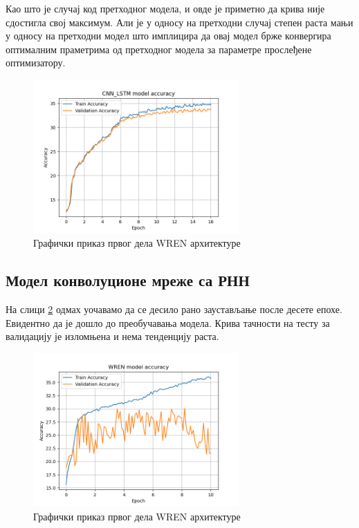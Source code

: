 \documentclass[a4paper, 12pt, master, utf8]{etf}
\begin{document}
Као што је случај код претходног модела, и овде је приметно да крива није сдостигла свој максимум. Али је у односу на претходни случај степен раста мањи у односу на претходни модел што 
имплицира да овај модел брже конвергира оптималним праметрима од претходног модела за параметре прослеђене оптимизатору.
\newline

\begin{figure}[H]
    \centering
    \includegraphics[width=0.7\textwidth]{../Results/CNN_LSTM_21_11_09/accuracy.png}
    \caption{Графички приказ првог дела WREN архитектуре}
    \label{fig:lstmacc}
\end{figure}

\subsection{Модел конволуционе мреже са РНН}

На слици \ref{fig:wrenacc} одмах уочавамо да се десило рано заустављање после десете епохе. Евидентно да је дошло до преобучавања модела.
Крива тачности на тесту за валидацију је изломњена и нема тенденцију раста.

\begin{figure}[H]
    \centering
    \includegraphics[width=0.7\textwidth]{../Results/WildRelationalNetwork_22_17_09/accuracy.png}
    \caption{Графички приказ првог дела WREN архитектуре}
    \label{fig:wrenacc}
\end{figure}
\end{document}
